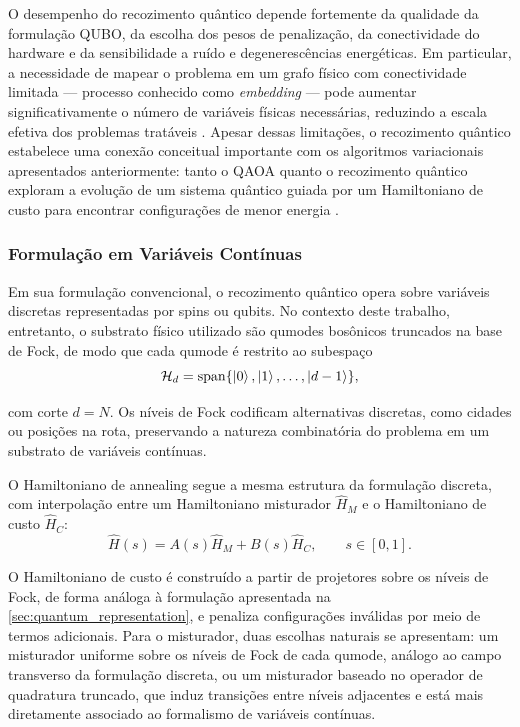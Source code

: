 O desempenho do recozimento quântico depende fortemente da qualidade da formulação QUBO, da escolha dos pesos de penalização, da conectividade do hardware e da sensibilidade a ruído e degenerescências energéticas. Em particular, a necessidade de mapear o problema em um grafo físico com conectividade limitada — processo conhecido como \textit{embedding} — pode aumentar significativamente o número de variáveis físicas necessárias, reduzindo a escala efetiva dos problemas tratáveis \cite{choi2008minor}. Apesar dessas limitações, o recozimento quântico estabelece uma conexão conceitual importante com os algoritmos variacionais apresentados anteriormente: tanto o QAOA quanto o recozimento quântico exploram a evolução de um sistema quântico guiada por um Hamiltoniano de custo para encontrar configurações de menor energia \cite{mcgeoch2022adiabatic}.


\subsubsection{Formulação em Variáveis Contínuas}
\label{sec:quantum_annealing_cv}

Em sua formulação convencional, o recozimento quântico opera sobre variáveis discretas representadas por spins ou qubits. No contexto deste trabalho, entretanto, o substrato físico utilizado são qumodes bosônicos truncados na base de Fock, de modo que cada qumode é restrito ao subespaço
\begin{equation}
    \mathcal{H}_{d}
    =
    \mathrm{span}
    \{
    \ket{0},\ket{1},\ldots,\ket{d-1}
    \},
\end{equation}

\noindent com corte $d=N$. Os níveis de Fock codificam alternativas discretas, como cidades ou posições na rota, preservando a natureza combinatória do problema em um substrato de variáveis contínuas.

O Hamiltoniano de annealing segue a mesma estrutura da formulação discreta, com interpolação entre um Hamiltoniano misturador $\hat{H}_M$ e o Hamiltoniano de custo $\hat{H}_C$:
\begin{equation}
    \hat{H}(s)
    =
    A(s)\hat{H}_{M}
    +
    B(s)\hat{H}_{C},
    \qquad
    s \in [0,1].
\end{equation}

O Hamiltoniano de custo é construído a partir de projetores sobre os níveis de Fock, de forma análoga à formulação apresentada na \autoref{sec:quantum_representation}, e penaliza configurações inválidas por meio de termos adicionais. Para o misturador, duas escolhas naturais se apresentam: um misturador uniforme sobre os níveis de Fock de cada qumode, análogo ao campo transverso da formulação discreta, ou um misturador baseado no operador de quadratura truncado, que induz transições entre níveis adjacentes e está mais diretamente associado ao formalismo de variáveis contínuas.

